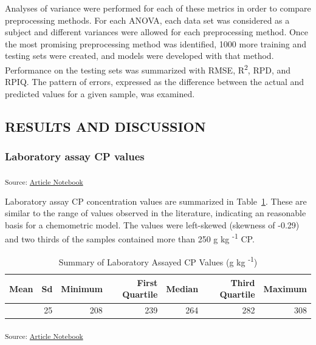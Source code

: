 \documentclass[
]{agujournal2019}
\begin{document}
Analyses of variance were performed for each of these metrics in order
to compare preprocessing methods. For each ANOVA, each data set was
considered as a subject and different variances were allowed for each
preprocessing method. Once the most promising preprocessing method was
identified, 1000 more training and testing sets were created, and models
were developed with that method. Performance on the testing sets was
summarized with RMSE, R\textsuperscript{2}, RPD, and RPIQ. The pattern
of errors, expressed as the difference between the actual and predicted
values for a given sample, was examined.

\subsection{RESULTS AND DISCUSSION}\label{results-and-discussion}

\subsubsection{Laboratory assay CP
values}\label{laboratory-assay-cp-values}

\textsubscript{Source:
\href{https://rvcrawford.github.io/glowing-system/index.qmd.html}{Article
Notebook}}

Laboratory assay CP concentration values are summarized in
Table~\ref{tbl-lab-protein-vals}. These are similar to the range of
values observed in the literature, indicating an reasonable basis for a
chemometric model. The values were left-skewed (skewness of -0.29) and
two thirds of the samples contained more than 250 g kg
\textsuperscript{-1} CP.

\begin{longtable}[]{@{}rrrrrrr@{}}

\caption{\label{tbl-lab-protein-vals}Summary of Laboratory Assayed CP
Values (g kg \textsuperscript{-1})}

\tabularnewline

\toprule\noalign{}
Mean & Sd & Minimum & First Quartile & Median & Third Quartile &
Maximum \\
\midrule\noalign{}
\endhead
\bottomrule\noalign{}
\endlastfoot
261 & 25 & 208 & 239 & 264 & 282 & 308 \\

\end{longtable}

\textsubscript{Source:
\href{https://rvcrawford.github.io/glowing-system/index.qmd.html}{Article
Notebook}}
\end{document}
